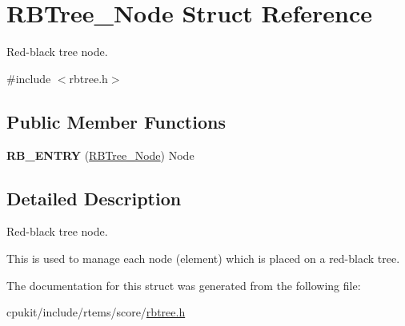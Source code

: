 \hypertarget{structRBTree__Node}{}\section{R\+B\+Tree\+\_\+\+Node Struct Reference}
\label{structRBTree__Node}


Red-\/black tree node.  




{\ttfamily \#include $<$rbtree.\+h$>$}

\subsection*{Public Member Functions}
\begin{DoxyCompactItemize}
\item 
\mbox{\label{structRBTree__Node_aaf0b3ade3399cc27ce92431e00089313}} 
{\bfseries R\+B\+\_\+\+E\+N\+T\+RY} (\mbox{\hyperlink{structRBTree__Node}{R\+B\+Tree\+\_\+\+Node}}) Node
\end{DoxyCompactItemize}


\subsection{Detailed Description}
Red-\/black tree node. 

This is used to manage each node (element) which is placed on a red-\/black tree. 

The documentation for this struct was generated from the following file\+:\begin{DoxyCompactItemize}
\item 
cpukit/include/rtems/score/\mbox{\hyperlink{rtems_2score_2rbtree_8h}{rbtree.\+h}}\end{DoxyCompactItemize}
